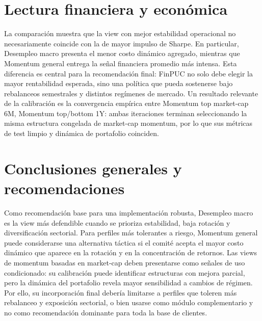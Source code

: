 \documentclass[11pt]{article}
\begin{document}
\section{Lectura financiera y económica}
\begin{table}[H]
\centering
{}
\caption{Resumen financiero y económico agregado por view.}
\label{tab:comparativo:p4}
\end{table}

La comparación muestra que la view con mejor estabilidad operacional no necesariamente coincide con la de mayor impulso de Sharpe. En particular, Desempleo macro presenta el menor costo dinámico agregado, mientras que Momentum general entrega la señal financiera promedio más intensa. Esta diferencia es central para la recomendación final: FinPUC no solo debe elegir la mayor rentabilidad esperada, sino una política que pueda sostenerse bajo rebalanceos semestrales y distintos regímenes de mercado.
Un resultado relevante de la calibración es la convergencia empírica entre Momentum top market-cap 6M, Momentum top/bottom 1Y: ambas iteraciones terminan seleccionando la misma estructura congelada de market-cap momentum, por lo que sus métricas de test limpio y dinámica de portafolio coinciden.
\section{Conclusiones generales y recomendaciones}
Como recomendación base para una implementación robusta, Desempleo macro es la view más defendible cuando se prioriza estabilidad, baja rotación y diversificación sectorial. Para perfiles más tolerantes a riesgo, Momentum general puede considerarse una alternativa táctica si el comité acepta el mayor costo dinámico que aparece en la rotación y en la concentración de retornos.
Las views de momentum basadas en market-cap deben presentarse como señales de uso condicionado: su calibración puede identificar estructuras con mejora parcial, pero la dinámica del portafolio revela mayor sensibilidad a cambios de régimen. Por ello, su incorporación final debería limitarse a perfiles que toleren más rebalanceo y exposición sectorial, o bien usarse como módulo complementario y no como recomendación dominante para toda la base de clientes.
\end{document}
